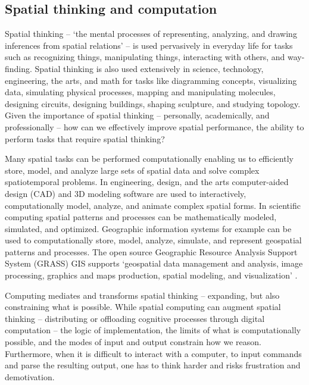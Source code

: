 \documentclass[prodmode,acmtochi]{acmsmall} %
\begin{document}
\subsection{Spatial thinking and computation}

Spatial thinking -- `the mental processes of representing, analyzing, and drawing inferences from spatial relations' \cite{Uttal2013} -- is used pervasively in everyday life %
for tasks such as recognizing things, manipulating things, interacting with others, and way-finding. 
%
Spatial thinking is also used extensively in science, technology, engineering, the arts, and math 
for tasks like 
diagramming concepts, 
visualizing data, %
simulating physical processes,
mapping and manipulating molecules,
designing circuits, 
designing buildings, 
shaping sculpture,
and studying topology. 
%
Given the importance of spatial thinking -- personally, academically, and professionally -- 
how can we effectively improve spatial performance, the ability to perform tasks that require spatial thinking? 


Many spatial tasks can be performed computationally 
enabling us to efficiently store, model, and analyze large sets of spatial data 
and solve complex spatiotemporal problems.
%
In engineering, design, and the arts 
computer-aided design (CAD) and 3D modeling software are used to interactively, computationally model, analyze, and animate complex spatial forms. 
%
In scientific computing spatial patterns and processes can be mathematically modeled, simulated, and optimized. 
%
Geographic information systems for example can be used to computationally store, model, analyze, simulate, and represent geospatial patterns and processes. 
%
The open source 
Geographic Resource Analysis Support System (GRASS) GIS supports 
`geospatial data management and analysis, image processing, graphics and maps production, spatial modeling, and visualization' \cite{GRASS}. 

Computing mediates and transforms spatial thinking -- expanding, but also constraining what is possible.
%
While spatial computing can augment spatial thinking 
-- distributing or offloading cognitive processes through digital computation -- 
the logic of implementation,
the limits of what is computationally possible, 
and the modes of input and output
constrain how we reason. %
%
Furthermore, 
when it is difficult to interact with a computer, 
to input commands and parse the resulting output, 
one has to think harder 
and risks frustration and demotivation. %
\end{document}
